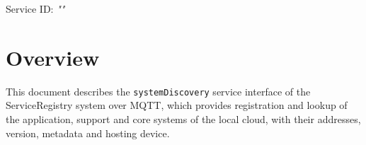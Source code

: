 \documentclass[a4paper]{arrowhead}
\begin{document}
\sloppy

\ArrowheadSetup

\begin{center}
  \vspace*{1cm}
  \huge{\arrowtitle}

  \vspace*{0.2cm}
  \LARGE{\arrowtype}
  \vspace*{1cm}

  \Large{Service ID: \textit{"\arrowid"}}

  \vspace*{\fill}


  \vspace*{1cm}
  \vspace*{\fill}

  \begin{abstract}
    This document describes the MQTT protocol with TLS payload security and JSON payload encoding variant of the \texttt{systemDiscovery} service of the ServiceRegistry system.
  \end{abstract}

  \vspace*{1cm}
\end{center}

\newpage

\tableofcontents
\newpage

\section{Overview}
\label{sec:overview}

This document describes the \texttt{systemDiscovery} service interface of the ServiceRegistry system over MQTT, which provides registration and lookup of the application, support and core systems of the local cloud, with their addresses, version, metadata and hosting device.
\end{document}
